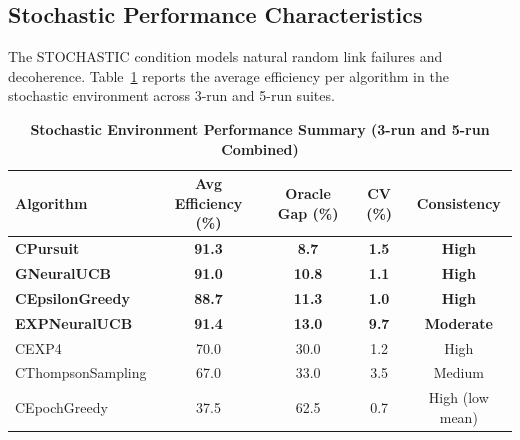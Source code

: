 \documentclass[12pt,a4paper]{article}
\newcommand{\performance}[1]{\textcolor{performancecolor}{\textbf{#1}}}
\newcommand{\stochastic}[1]{\textcolor{stochasticcolor}{\textbf{#1}}}
\newcommand{\legacy}[1]{\textcolor{legacycolor}{\textbf{#1}}}
\newcommand{\neural}[1]{\textcolor{neuralcolor}{\textbf{#1}}}
\begin{document}
\begin{tcolorbox}[colback=stochasticcolor!10,colframe=stochasticcolor,title=\textbf{Stochastic Environment Deep Analysis (1$\times$–2$\times$ Capacities, T/Tb Combined, 3-run/5-run)}]

\subsection{Stochastic Performance Characteristics}

The STOCHASTIC condition models natural random link failures and decoherence. Table~\ref{tab:stoch-performance} reports the average efficiency per algorithm in the stochastic environment across 3-run and 5-run suites.

\begin{table}[H]
\centering
\caption{\stochastic{Stochastic Environment Performance Summary (3-run and 5-run Combined)}}
\label{tab:stoch-performance}
\begin{tabular}{|l|c|c|c|c|}
\hline
\textbf{Algorithm} & \textbf{Avg Efficiency (\%)} & \textbf{Oracle Gap (\%)} & \textbf{CV (\%)} & \textbf{Consistency} \\
\hline
\hline
\stochastic{CPursuit}        & \stochastic{91.3} & \stochastic{8.7}  & \stochastic{1.5} & \stochastic{High} \\
\neural{GNeuralUCB}          & \neural{91.0} & \neural{10.8}     & \neural{1.1} & \neural{High} \\
\performance{CEpsilonGreedy} & \performance{88.7}                        & \performance{11.3} & \performance{1.0} & \performance{High} \\
\legacy{EXPNeuralUCB}        & \legacy{91.4}               & \legacy{13.0}     & \legacy{9.7}     & \legacy{Moderate} \\
CEXP4                        & 70.0                        & 30.0              & 1.2              & High \\
CThompsonSampling            & 67.0                        & 33.0              & 3.5              & Medium \\
CEpochGreedy                 & 37.5                        & 62.5              & 0.7              & High (low mean) \\
\hline
\end{tabular}
\end{table}


\end{tcolorbox}
\end{document}
